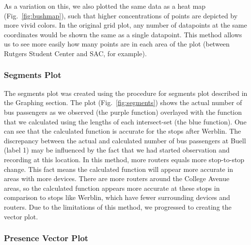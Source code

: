 As a variation on this, we also plotted the same data as a heat map (Fig.~\ref{fig:bushmap}), such that higher concentrations of points are depicted by more vivid colors.
In the original grid plot, any number of datapoints at the same coordinates would be shown the same as a single datapoint.
This method allows us to see more easily how many points are in each area of the plot (between Rutgers Student Center and SAC, for example).

\subsubsection*{Segments Plot}
The segments plot was created using the procedure for segments plot described in the Graphing section.
The plot (Fig.~\ref{fig:segments}) shows the actual number of bus passengers as we observed (the purple function) overlayed with the function that we calculated using the lengths of each intersect-set (the blue function).
One can see that the calculated function is accurate for the stops after Werblin.
The discrepancy between the actual and calculated number of bus passengers at Buell (label 1) may be influenced by the fact that we had started observation and recording at this location. In this method, more routers equals more stop-to-stop change.
This fact means the calculated function will appear more accurate in areas with more devices.
There are more routers around the College Avenue areas, so the calculated function appears more accurate at these stops in comparison to stops like Werblin, which have fewer surrounding devices and routers.
Due to the limitations of this method, we progressed to creating the vector plot.

\subsubsection*{Presence Vector Plot}


